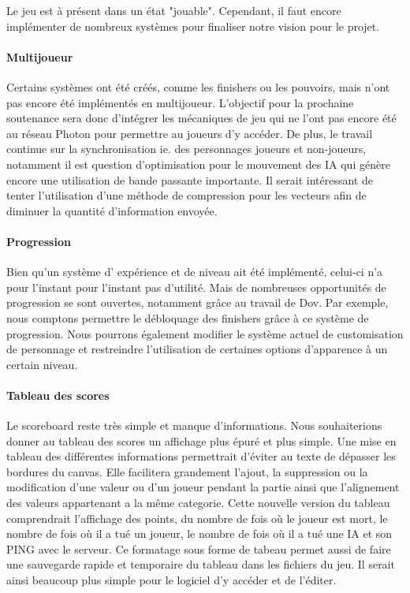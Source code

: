        Le jeu est à présent dans un état "jouable". Cependant, il faut encore implémenter de nombreux systèmes pour finaliser notre vision pour le projet.

        \paragraph{Multijoueur}

            Certains systèmes ont été créés, comme les finishers ou les pouvoirs, mais n'ont pas encore été 
            implémentés en multijoueur. L'objectif pour la prochaine soutenance sera donc d'intégrer les mécaniques 
            de jeu qui ne l'ont pas encore été au réseau Photon pour permettre au joueurs d'y accéder. De plus, le 
            travail continue sur la synchronisation ie. des personnages joueurs et non-joueurs, notamment il est 
            question d'optimisation pour le mouvement des IA qui génère encore une utilisation de bande passante importante. 
            Il serait intéressant de tenter l'utilisation d'une méthode de compression pour les vecteurs afin de diminuer 
            la quantité d'information envoyée.


        \paragraph{Progression}

            Bien qu'un système d' expérience et de niveau ait été implémenté, celui-ci n'a pour l'instant pour 
            l'instant pas d'utilité. Mais de nombreuses opportunités de progression se sont ouvertes, 
            notamment grâce au travail de Dov. Par exemple, nous comptons permettre le débloquage des 
            finishers grâce à ce système de progression. Nous pourrons également modifier le système actuel 
            de customisation de personnage et restreindre l'utilisation de certaines options d'apparence à un certain niveau.


        \paragraph{Tableau des scores}

            Le scoreboard reste très simple et manque d’informations. Nous souhaiterions donner au tableau des scores un affichage plus épuré et plus simple. Une mise en tableau des différentes informations permettrait d’éviter au texte de dépasser les bordures du canvas. Elle facilitera grandement l’ajout, la suppression ou la modification d’une valeur ou d’un joueur pendant la partie ainsi que l’alignement des valeurs appartenant a la même categorie. 
            Cette nouvelle version du tableau comprendrait l'affichage des points, du nombre de fois où le joueur est mort, le nombre de fois où il a tué un joueur, le nombre de fois où il a tué une IA et son PING avec le serveur. Ce formatage sous forme de tabeau permet aussi de faire une sauvegarde rapide et temporaire du tableau dans les fichiers du jeu. Il serait ainsi beaucoup plus simple pour le logiciel d'y accéder et de l'éditer.
            
